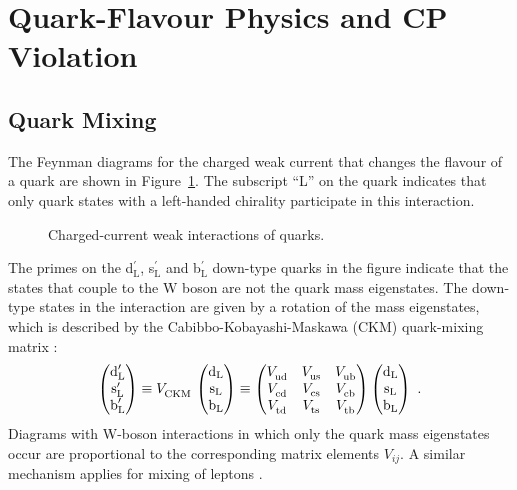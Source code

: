 \section{Quark-Flavour Physics and CP Violation}
\label{sec:intro_CPV}

\subsection{Quark Mixing}
\label{subsec:intro_mixCPV_mix}

The Feynman diagrams for the charged weak current that changes the flavour of a quark are shown in Figure~\ref{fig:WCouplings}. The
subscript ``L'' on the quark indicates that only quark states with a left-handed chirality participate in this interaction.
\begin{figure}[hbt]
  {\sffamily }
  \caption{Charged-current weak interactions of quarks.}
  \label{fig:WCouplings}
\end{figure}

The primes on the d$_\text{L}^\prime$, s$_\text{L}^\prime$ and b$_\text{L}^\prime$ down-type quarks in the figure indicate that the states
that couple to the W boson are not the quark mass eigenstates. The down-type states in the interaction are given by a rotation of the mass
eigenstates, which is described by the Cabibbo-Kobayashi-Maskawa (CKM) quark-mixing matrix \cite{Kobayashi:1973fv}:
\begin{equation}
  \begin{pmatrix} \text{d}_\text{L}^\prime \\ \text{s}_\text{L}^\prime \\ \text{b}_\text{L}^\prime \end{pmatrix}
    \equiv \VCKM\, \begin{pmatrix} \text{d}_\text{L} \\ \text{s}_\text{L} \\ \text{b}_\text{L} \end{pmatrix}
    \equiv \begin{pmatrix} \Vud & \Vus & \Vub \\ \Vcd & \Vcs & \Vcb \\ \Vtd & \Vts & \Vtb \end{pmatrix}
           \begin{pmatrix} \text{d}_\text{L} \\ \text{s}_\text{L} \\ \text{b}_\text{L} \end{pmatrix}
    \ .
\end{equation}
Diagrams with W-boson interactions in which only the quark mass eigenstates occur are proportional to the corresponding matrix elements
$V_{ij}$. A similar mechanism applies for mixing of leptons \cite{Pontecorvo:1957cp,*Pontecorvo:1957qd,*Maki:1962mu,*Pontecorvo:1967fh}.

